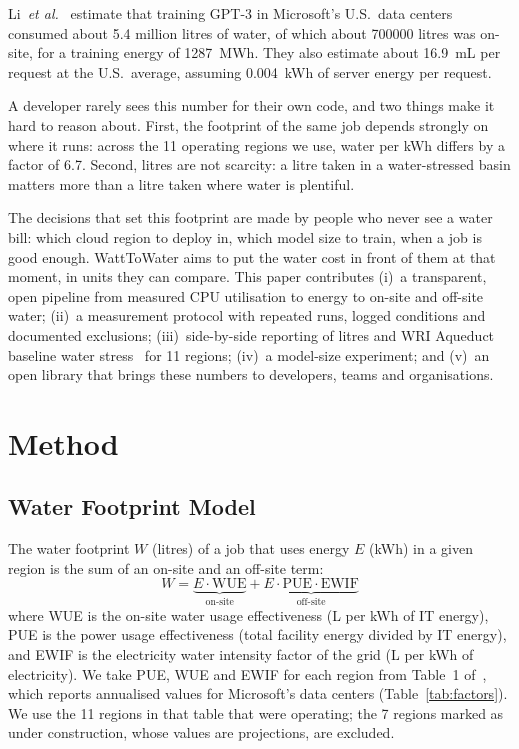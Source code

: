 \documentclass[conference]{IEEEtran}
\begin{document}
Li~\textit{et al.}~\cite{li2023thirsty} estimate that training GPT-3 in Microsoft's U.S.\ data centers consumed about 5.4 million litres of water, of which about \num{700000} litres was on-site, for a training energy of \num{1287}~MWh. They also estimate about 16.9~mL per request at the U.S.\ average, assuming 0.004~kWh of server energy per request.

A developer rarely sees this number for their own code, and two things make it hard to reason about. First, the footprint of the same job depends strongly on where it runs: across the 11 operating regions we use, water per kWh differs by a factor of 6.7. Second, litres are not scarcity: a litre taken in a water-stressed basin matters more than a litre taken where water is plentiful.

The decisions that set this footprint are made by people who never see a water bill: which cloud region to deploy in, which model size to train, when a job is good enough. WattToWater aims to put the water cost in front of them at that moment, in units they can compare. This paper contributes (i)~a transparent, open pipeline from measured CPU utilisation to energy to on-site and off-site water; (ii)~a measurement protocol with repeated runs, logged conditions and documented exclusions; (iii)~side-by-side reporting of litres and WRI Aqueduct baseline water stress~\cite{wri2023aqueduct} for 11 regions; (iv)~a model-size experiment; and (v)~an open library that brings these numbers to developers, teams and organisations.

\section{Method}

\subsection{Water Footprint Model}

The water footprint $W$ (litres) of a job that uses energy $E$ (kWh) in a given region is the sum of an on-site and an off-site term:
\begin{equation}
W = \underbrace{E \cdot \mathrm{WUE}}_{\text{on-site}} + \underbrace{E \cdot \mathrm{PUE} \cdot \mathrm{EWIF}}_{\text{off-site}}
\label{eq:water}
\end{equation}
where WUE is the on-site water usage effectiveness (L per kWh of IT energy), PUE is the power usage effectiveness (total facility energy divided by IT energy), and EWIF is the electricity water intensity factor of the grid (L per kWh of electricity). We take PUE, WUE and EWIF for each region from Table~1 of~\cite{li2023thirsty}, which reports annualised values for Microsoft's data centers (Table~\ref{tab:factors}). We use the 11 regions in that table that were operating; the 7 regions marked as under construction, whose values are projections, are excluded.
\end{document}

